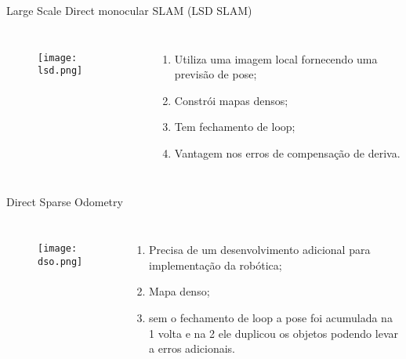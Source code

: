 \begin{frame}[c]{Large Scale Direct monocular SLAM (LSD SLAM)}
    \transboxout[duration=0.5]
    \begin{columns}
            \begin{figure}
            \texttt{[image: lsd.png]}
            \caption{\cite{LargeSca63}}
            \end{figure}
            \begin{enumerate}
                \item Utiliza uma imagem local fornecendo uma previsão de pose;
                \item Constrói mapas densos;
                \item Tem fechamento de loop;
                \item Vantagem nos erros de compensação de deriva.
            \end{enumerate}
    \end{columns}

\end{frame}
\begin{frame}[c]{Direct Sparse Odometry}
    \transboxout[duration=0.5]
    \begin{columns}
            \begin{figure}
            \texttt{[image: dso.png]}
            \caption{\cite{DSODirec99}}
            \end{figure}
            \begin{enumerate}
                \item Precisa de um desenvolvimento adicional para implementação da robótica;
                \item Mapa denso;
                \item sem o fechamento de loop a pose foi acumulada na 1 volta e na 2 ele duplicou os objetos podendo levar a erros adicionais.
            \end{enumerate}
    \end{columns}

\end{frame}
